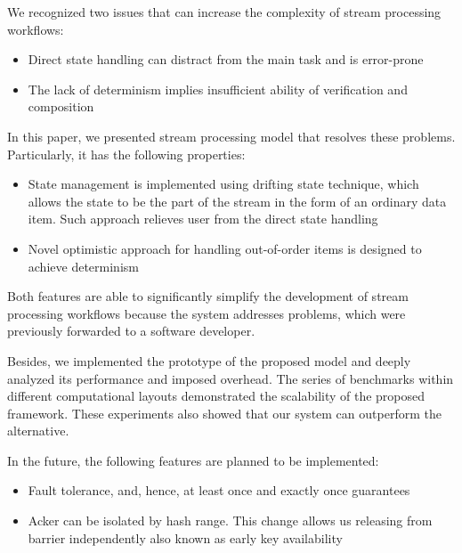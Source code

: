 
\label {fs-conclusions}

We recognized two issues that can increase the complexity of stream processing workflows:

\begin{itemize}
    \item Direct state handling can distract from the main task and is error-prone 
    \item The lack of determinism implies insufficient ability of verification and composition
\end{itemize}

In this paper, we presented stream processing model that resolves these problems. Particularly, it has the following properties:

\begin{itemize}
    \item State management is implemented using drifting state technique, which allows the state to be the part of the stream in the form of an ordinary data item. Such approach relieves user from the direct state handling
    \item Novel optimistic approach for handling out-of-order items is designed to achieve determinism
\end{itemize}

Both features are able to significantly simplify the development of stream processing workflows because the system addresses problems, which were previously forwarded to a software developer.

Besides, we implemented the prototype of the proposed model and deeply analyzed its performance and imposed overhead. The series of benchmarks within different computational layouts demonstrated the scalability of the proposed framework. These experiments also showed that our system can outperform the alternative.

In the future, the following features are planned to be implemented:
\begin{itemize}
    \item Fault tolerance, and, hence, at least once and exactly once guarantees
    \item Acker can be isolated by hash range. This change allows us releasing from barrier independently also known as early key availability
\end{itemize}
